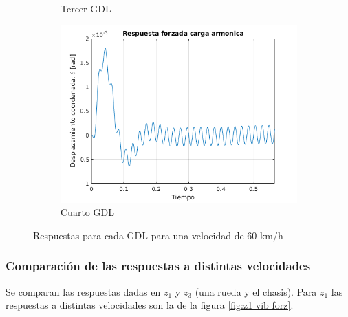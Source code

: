 \documentclass[oneside, a4paper, spanish, links]{amca}
\begin{document}
\begin{figure}[h]
\begin{subfigure}[b]{0.475\textwidth}
        \caption[]%
        {{\small Tercer GDL}}    
    \end{subfigure}
    \quad
    \begin{subfigure}[b]{0.475\textwidth}   
        \centering 
        \includegraphics[width=\textwidth]{respforcompletatheta60kmh.png}
        \caption[]%
        {{\small Cuarto GDL}}    
    \end{subfigure}
    \caption[  ]
    {\small Respuestas para cada GDL para una velocidad de 60 km/h} 
    \label{fig:vib forz vel 60}
\end{figure}

\newpage
\subsubsection{Comparación de las respuestas a distintas velocidades}

Se comparan las respuestas dadas en $z_1$ y $z_3$ (una rueda y el chasis). 
Para $z_1$ las respuestas a distintas velocidades son la de la figura \ref{fig:z1 vib forz}.
\end{document}
